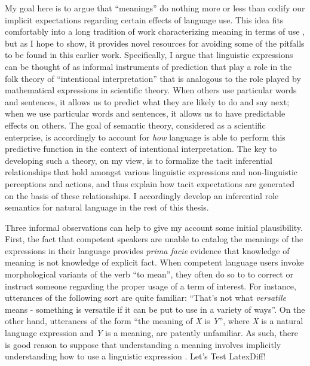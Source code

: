 My goal here is to argue that ``meanings'' do nothing more or less than codify our implicit expectations regarding certain effects of language use. This idea fits comfortably into a long tradition of work characterizing meaning in terms of use \citep{Sellars:1954,Wittgenstein:1953,Sellars:1953,Harman:1982,Block:1986,Brandom:1994,Brandom:2000,Brandom:2009,Horwich:2005}, but as I hope to show, it provides novel resources for avoiding some of the pitfalls to be found in this earlier work. Specifically, I argue that linguistic expressions can be thought of as informal instruments of prediction that play a role in the folk theory of ``intentional interpretation'' \citep{Dennett:1987,Brandom:1994} that is analogous to the role played by mathematical expressions in scientific theory. When others use particular words and sentences, it allows us to predict what they are likely to do and say next; when we use particular words and sentences, it allows us to have predictable effects on others. The goal of semantic theory, considered as a scientific enterprise, is accordingly to account for \textit{how} language is able to perform this predictive function in the context of intentional interpretation. The key to developing such a theory, on my view, is to formalize the tacit inferential relationships that hold amongst various linguistic expressions and non-linguistic perceptions and actions, and thus explain how tacit expectations are generated on the basis of these relationships. I accordingly develop an inferential role semantics for natural language in the rest of this thesis. 

Three informal observations can help to give my account some initial plausibility. First, the fact that competent speakers are unable to catalog the meanings of the expressions in their language provides \textit{prima facie} evidence that knowledge of meaning is not knowledge of explicit fact. When competent language users invoke morphological variants of the verb ``to mean'', they often do so to to correct or instruct someone regarding the proper usage of a term of interest. For instance, utterances of the following sort are quite familiar: ``That's not what \textit{versatile} means - something is versatile if it can be put to use in a variety of ways''. On the other hand, utterances of the form ``the meaning of \textit{X} is \textit{Y}'', where \textit{X} is a natural language expression and \textit{Y} is a meaning, are patently unfamiliar. As such, there is good reason to suppose that understanding a meaning involves implicitly understanding how to use a linguistic expression \citep{Brandom:1994,Horwich:2005}. Let's Test LatexDiff!

